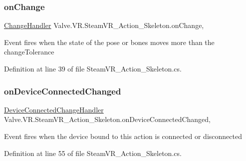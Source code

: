 \subsubsection{\texorpdfstring{onChange}{onChange}}
{\footnotesize\ttfamily \mbox{\hyperlink{class_valve_1_1_v_r_1_1_steam_v_r___action___skeleton_a41a68545cb313ef9f47600d9e9022177}{Change\+Handler}} Valve.\+V\+R.\+Steam\+V\+R\+\_\+\+Action\+\_\+\+Skeleton.\+on\+Change\hspace{0.3cm}{\ttfamily [add]}, {\ttfamily [remove]}}



Event fires when the state of the pose or bones moves more than the change\+Tolerance 



Definition at line 39 of file Steam\+V\+R\+\_\+\+Action\+\_\+\+Skeleton.\+cs.

\mbox{\label{class_valve_1_1_v_r_1_1_steam_v_r___action___skeleton_a91459f7239653ba24ef381285c999069}} 
\subsubsection{\texorpdfstring{onDeviceConnectedChanged}{onDeviceConnectedChanged}}
{\footnotesize\ttfamily \mbox{\hyperlink{class_valve_1_1_v_r_1_1_steam_v_r___action___skeleton_a737d68e8f67790bf838b4f5bac3ffae1}{Device\+Connected\+Change\+Handler}} Valve.\+V\+R.\+Steam\+V\+R\+\_\+\+Action\+\_\+\+Skeleton.\+on\+Device\+Connected\+Changed\hspace{0.3cm}{\ttfamily [add]}, {\ttfamily [remove]}}



Event fires when the device bound to this action is connected or disconnected 



Definition at line 55 of file Steam\+V\+R\+\_\+\+Action\+\_\+\+Skeleton.\+cs.

\mbox{\label{class_valve_1_1_v_r_1_1_steam_v_r___action___skeleton_ab2bc1933b34032d38d02e78f641c5e78}} 
